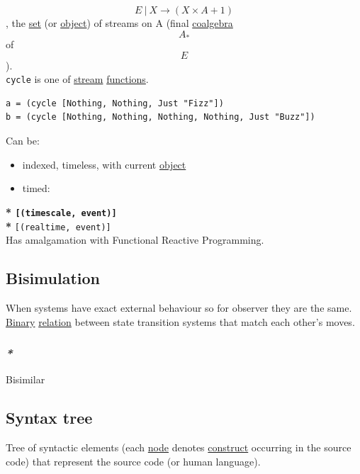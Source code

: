 \documentclass[11pt]{article}
\begin{document}
$$ E \ | \ X \to (X \times A + 1) $$, the \hyperref[orgbed80ba]{set} (or \hyperref[org025aac8]{object}) of streams on A (final \hyperref[orgf6509c0]{coalgebra} $$ A_{*} $$ of $$ E $$).\\

\texttt{cycle} is one of \hyperref[orgafcaa02]{stream} \hyperref[org66c5288]{functions}.\\
\begin{verbatim}
a = (cycle [Nothing, Nothing, Just "Fizz"])
b = (cycle [Nothing, Nothing, Nothing, Nothing, Just "Buzz"])
\end{verbatim}

Can be:\\
\begin{itemize}
\item indexed, timeless, with current \hyperref[org025aac8]{object}\\
\item timed:\\
\end{itemize}
\textbf{* \texttt{[(timescale, event)]}\\
*} \texttt{[(realtime, event)]}\\

Has amalgamation with Functional Reactive Programming.\\

\subsection{\label{org7438723}Bisimulation}
\label{sec:orgeafb601}
When systems have exact external behaviour so for observer they are the same.\\

\hyperref[orgee106ab]{Binary} \hyperref[org6e8ae46]{relation} between state transition systems that match each other's moves.\\

\subsubsection{\emph{*}}
\label{sec:org2ebeb87}

\label{orgcf11400}Bisimilar\\

\subsection{\label{org66b5ad6}Syntax tree}
\label{sec:org737a403}
Tree of syntactic elements (each \hyperref[org25ccf6c]{node} denotes \hyperref[orgc1046f9]{construct} occurring in the source code) that represent the source code (or human language).\\
\end{document}
